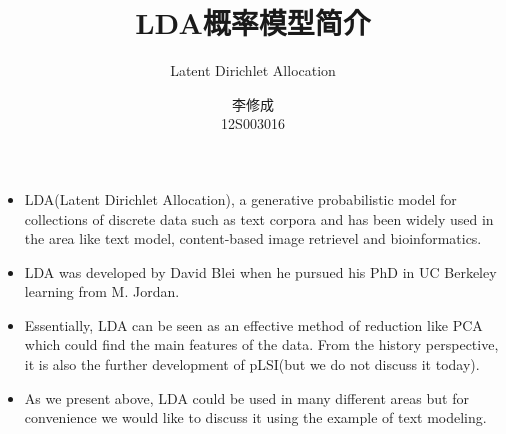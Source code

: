 \documentclass{beamer}
\title{LDA概率模型简介}
\subtitle{Latent Dirichlet Allocation}
\author{李修成\\12S003016}
\institute[HIT]
{
    Department of Computer Science\\
    Harbin Institute of Technology
}
\date{}
\begin{document}
\begin{frame}
  \titlepage
\end{frame}



\begin{frame}
  \begin{itemize}
  \item {
        LDA(Latent Dirichlet Allocation), a generative probabilistic model for collections of discrete data such as
        text corpora and has been widely used in the area like text model, content-based image retrievel and 
        bioinformatics.
  }
  \item LDA was developed by David Blei when he pursued his PhD in UC Berkeley learning from M. Jordan.\\
  \end{itemize}
\end{frame}

\begin{frame}
 \begin{itemize}
  \item {
    Essentially, LDA can be seen as an effective method of reduction like PCA which could find the main features
    of the data. From the history perspective, it is also the further development of pLSI(but we do not discuss 
    it today).
  }
  \item {
        As we present above, LDA could be used in many different areas but for convenience we would like
        to discuss it using the example of text modeling.
  }  
  \end{itemize}
\end{frame}
\end{document}

